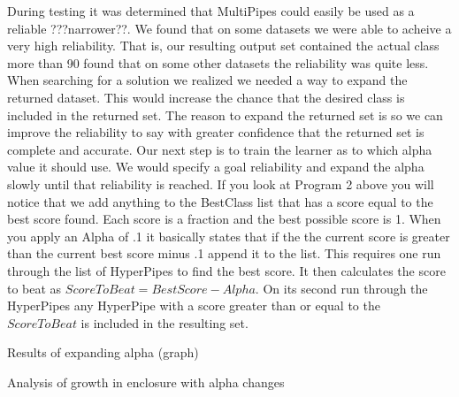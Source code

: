 During testing it was determined that MultiPipes could easily be used 
as a reliable ???narrower??. We found that on some datasets we were 
able to acheive a very high reliability. That is, our resulting output 
set contained the actual class more than 90%
found that on some other datasets the reliability was quite less. 
When searching for a solution we realized we needed a way to expand 
the returned dataset. This would increase the chance that the desired 
class is included in the returned set. The reason to expand the 
returned set is so we can improve the reliability to say with greater
confidence that the returned set is complete and accurate. Our next 
step is to train the learner as to which alpha value it should use. 
We would specify a goal reliability and expand the alpha slowly until 
that reliability is reached. If you look at Program 2 above you will 
notice that we add anything to the BestClass list that has a score 
equal to the best score found. Each score is a fraction and the best 
possible score is 1. When you apply an Alpha of .1 it basically 
states that if the the current score is greater than the current best 
score minus .1 append it to the list. This requires one run through the 
list of HyperPipes to find the best score. It then calculates the score 
to beat as \begin{math}ScoreToBeat = BestScore - Alpha\end{math}. On its second run through the 
HyperPipes any HyperPipe with a score greater than or equal to the 
\begin{math}ScoreToBeat\end{math} is included in the resulting set. 

Results of expanding alpha (graph)

Analysis of growth in enclosure with alpha changes

